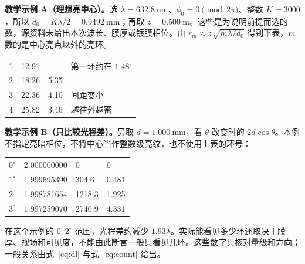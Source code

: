 \documentclass[11pt]{ctexart}
\begin{document}

\textbf{教学示例 A（理想亮中心）。}选 \(\lambda=632.8\ \mathrm{nm}\)、\(\phi_0=0\pmod{2\pi}\)、整数 \(K=3000\)，所以 \(d_0=K\lambda/2=0.9492\ \mathrm{mm}\)；再取 \(z=0.500\ \mathrm{m}\)。这些是为说明前提而选的数，源资料未给出本次波长、膜厚或镀膜相位。由 \(r_m\approx z\sqrt{m\lambda/d_0}\) 得到下表，\(m\) 数的是中心亮点以外的亮环。

\begin{center}
\small
\begin{tabular}{@{}C{1.6cm}C{2.4cm}C{2.4cm}C{3.2cm}@{}}
\toprule
{} &  &  & \\
 & 12.91 & --- & 第一环约在 \(1.48^\circ\)\\
2 & 18.26 & 5.35 & \\
3 & 22.36 & 4.10 & 间距变小\\
4 & 25.82 & 3.46 & 越往外越密\\
\bottomrule
\end{tabular}
\end{center}

\textbf{教学示例 B（只比较光程差）。}另取 \(d=1.000\ \mathrm{mm}\)，看 \(\theta\) 改变时的 \(2d\cos\theta\)。本例不指定亮暗相位，不将中心当作整数级亮纹，也不使用上表的环号：

\begin{center}
\small
\begin{tabular}{@{}C{1.6cm}C{4.4cm}C{4.6cm}C{3.0cm}@{}}
\toprule
\thead{\(\theta\)} &  &  & \\
\midrule
\(0^\circ\) & 2.000000000 & 0 & 0\\
\(1^\circ\) & 1.999695390 & 304.6 & 0.481\\
\(2^\circ\) & 1.998781654 & 1218.3 & 1.925\\
\(3^\circ\) & 1.997259070 & 2740.9 & 4.331\\
\bottomrule
\end{tabular}
\end{center}

在这个示例的 \(0\)--\(2^\circ\) 范围，光程差约减少 \(1.93\lambda\)。实际能看见多少环还取决于膜厚、视场和可见度，不能由此断言一般只看见几环。这些数字只核对量级和方向；一般关系由式~\eqref{eq:dl} 与式~\eqref{eq:count} 给出。

\end{document}
